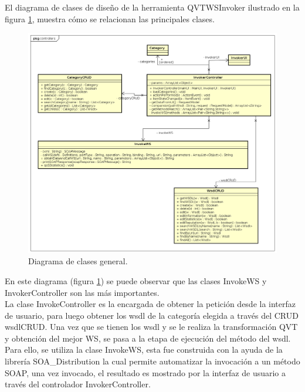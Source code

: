  El diagrama de clases de diseño de la herramienta QVTWSInvoker ilustrado en la figura \ref{fig:Diagrama de clases general}, muestra cómo se relacionan las principales clases.\\

  \begin{figure}[H] 
  	\begin{center}
  		\includegraphics [scale=0.45]{imagenes/diagrama_clases_general.png}
  	\end{center}
  	\caption{Diagrama de clases general.}
  	\label{fig:Diagrama de clases general}
  \end{figure}


   En este diagrama (figura \ref{fig:Diagrama de clases general}) se puede observar que las clases InvokeWS y InvokerController son las más importantes. \\
  La clase InvokeController es la encargada de obtener la petición desde la interfaz de usuario, para luego obtener los wsdl de la categoría elegida a través del CRUD wsdlCRUD. Una vez que se tienen los wsdl y se le realiza la transformación QVT y obtención del mejor WS, se pasa a la etapa de ejecución del método del wsdl. Para ello, se utiliza la clase InvokeWS, esta fue construida con la ayuda de la librería SOA\_Distribution la cual permite automatizar la invocación a un método SOAP, una vez invocado, el resultado es mostrado por la interfaz de usuario a través del controlador InvokerController.
  
